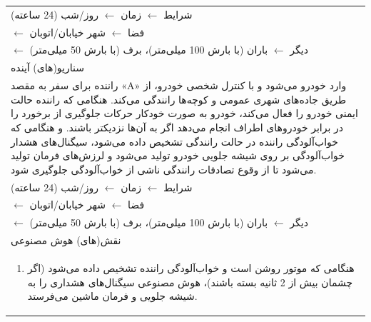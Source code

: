 \documentclass[a4paper,10pt]{article}
\begin{document}
\begin{table}[htbp]
\begin{tabularx}{\textwidth}{X}
                    شرایط $\leftarrow$ زمان $\leftarrow$ روز/شب (24 ساعته) \\
                    \hspace{24pt} $\leftarrow$ فضا $\leftarrow$ شهر خیابان/اتوبان \\
                    \hspace{24pt} $\leftarrow$ دیگر $\leftarrow$ باران (با بارش 100 میلی‌متر)، برف (با بارش 50 میلی‌متر) \\

                    \hline
                    
                    سناریو(های) آینده \\

                    \hline

                    راننده برای سفر به مقصد «A» وارد خودرو می‌شود و با کنترل شخصی خودرو، از طریق جاده‌های شهری عمومی و کوچه‌ها رانندگی می‌کند. هنگامی که راننده حالت ایمنی خودرو را فعال می‌کند، خودرو به صورت خودکار حرکات جلوگیری از برخورد را در برابر خودروهای اطراف انجام می‌دهد اگر به آن‌ها نزدیکتر باشند. و هنگامی که خواب‌آلودگی راننده در حالت رانندگی تشخیص داده می‌شود، سیگنال‌های هشدار خواب‌آلودگی بر روی شیشه جلویی خودرو تولید می‌شود و لرزش‌های فرمان تولید می‌شود تا از وقوع تصادفات رانندگی ناشی از خواب‌آلودگی جلوگیری شود. \\

                    شرایط $\leftarrow$ زمان $\leftarrow$ روز/شب (24 ساعته) \\
                    \hspace{24pt} $\leftarrow$ فضا $\leftarrow$ شهر خیابان/اتوبان \\
                    \hspace{24pt} $\leftarrow$ دیگر $\leftarrow$ باران (با بارش 100 میلی‌متر)، برف (با بارش 50 میلی‌متر) \\

                    \hline

                    نقش(های) هوش مصنوعی \\

                    \hline

                    \vspace{-10pt}

                    \begin{enumerate}
                        
                        \item هنگامی که موتور روشن است و خواب‌آلودگی راننده تشخیص داده می‌شود (اگر چشمان بیش از 2 ثانیه بسته باشند)، هوش مصنوعی سیگنال‌های هشداری را به شیشه جلویی و فرمان ماشین می‌فرستد.


\end{enumerate}
\end{tabularx}
\end{table}
\end{document}
